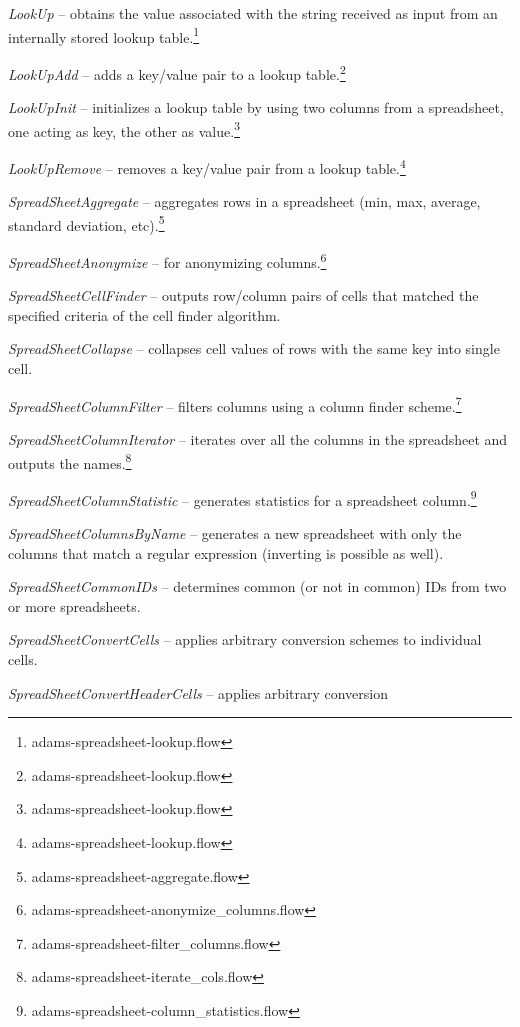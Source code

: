 \documentclass[a4paper]{book}
\begin{document}
\begin{tight_itemize}
	\item \textit{LookUp} -- obtains the value associated with the string 
	received as input from an internally stored lookup 
	table.\footnote{adams-spreadsheet-lookup.flow}
	\item \textit{LookUpAdd} -- adds a key/value pair to a lookup 
	table.\footnote{adams-spreadsheet-lookup.flow}
	\item \textit{LookUpInit} -- initializes a lookup table by using two columns
	from a spreadsheet, one acting as key, the other as 
	value.\footnote{adams-spreadsheet-lookup.flow}
	\item \textit{LookUpRemove} -- removes a key/value pair from a lookup 
	table.\footnote{adams-spreadsheet-lookup.flow}
	\item \textit{SpreadSheetAggregate} -- aggregates rows in a spreadsheet
	(min, max, average, standard deviation, etc).\footnote{adams-spreadsheet-aggregate.flow}
	\item \textit{SpreadSheetAnonymize} -- for anonymizing 
	columns.\footnote{adams-spreadsheet-anonymize\_columns.flow}
	\item \textit{SpreadSheetCellFinder} -- outputs row/column pairs of
	cells that matched the specified criteria of the cell finder algorithm.
	\item \textit{SpreadSheetCollapse} -- collapses cell values of rows with
	the same key into single cell.
	\item \textit{SpreadSheetColumnFilter} -- filters columns using a column
	finder scheme.\footnote{adams-spreadsheet-filter\_columns.flow}
	\item \textit{SpreadSheetColumnIterator} -- iterates over all the columns
	in the spreadsheet and outputs the names.\footnote{adams-spreadsheet-iterate\_cols.flow}
	\item \textit{SpreadSheetColumnStatistic} -- generates statistics for a 
	spreadsheet column.\footnote{adams-spreadsheet-column\_statistics.flow}
	\item \textit{SpreadSheetColumnsByName} -- generates a new spreadsheet with
	only the columns that match a regular expression (inverting is possible as well).
	\item \textit{SpreadSheetCommonIDs} -- determines common (or not in common)
	IDs from two or more spreadsheets.
	\item \textit{SpreadSheetConvertCells} -- applies arbitrary conversion
	schemes to individual cells.
	\item \textit{SpreadSheetConvertHeaderCells} -- applies arbitrary conversion 

\end{tight_itemize}
\end{document}
